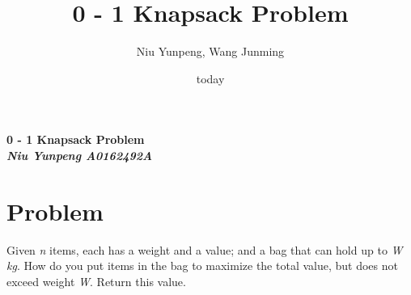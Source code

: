 \documentclass[12pt]{article} %
\begin{document}
\title{0 - 1 Knapsack Problem}
\author{Niu Yunpeng, Wang Junming}
\date{today}

\begin{center}

{\large\bf
0 - 1 Knapsack Problem\\
}
\vspace{0.2cm}
\emph{\textbf{Niu Yunpeng A0162492A}}
\end{center}


\section{Problem}
Given \emph{n} items, each has a weight and a value; and a bag that can hold up to \emph{W kg}. How do you put items in the bag to maximize the total value, but does not exceed weight \emph{W}. Return this value.

\end{document}
